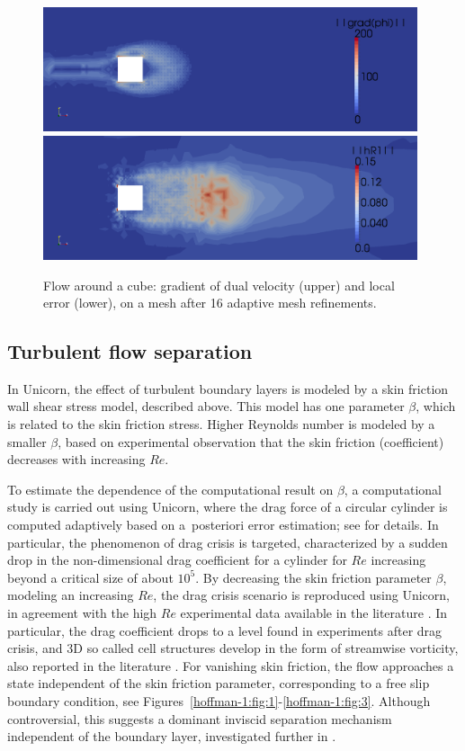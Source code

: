 \begin{figure}
  \centering
  \includegraphics[width=11cm]{chapters/hoffman-1/png/fig3a.png}
  \medskip
  \includegraphics[width=11cm]{chapters/hoffman-1/png/fig3b.png}
  \caption{Flow around a cube: gradient of dual velocity (upper) and local
    error (lower), on a mesh after 16 adaptive mesh refinements.}
  \label{hoffman-1:fig:cube3}
\end{figure}

\subsection{Turbulent flow separation}

In Unicorn, the effect of turbulent boundary layers is modeled by a
skin friction wall shear stress model, described above. This model has
one parameter $\beta$, which is related to the skin friction stress.
Higher Reynolds number is modeled by a smaller $\beta$, based on
experimental observation that the skin friction (coefficient)
decreases with increasing $Re$.

To estimate the dependence of the computational result on $\beta$, a
computational study is carried out using Unicorn, where the drag force
of a circular cylinder is computed adaptively based on a~posteriori
error estimation; see \citet{HoffmanJansson2009} for details. In
particular, the phenomenon of drag crisis is targeted, characterized
by a sudden drop in the non-dimensional drag coefficient for a
cylinder for $Re$ increasing beyond a critical size of about
$10^5$. By decreasing the skin friction parameter $\beta$, modeling an
increasing $Re$, the drag crisis scenario is reproduced using Unicorn,
in agreement with the high $Re$ experimental data available in the
literature \citep{Zdravkovich2003}. In particular, the drag
coefficient drops to a level found in experiments after drag crisis,
and 3D so called cell structures develop in the form of streamwise
vorticity, also reported in the literature \citep{Zdravkovich2003}.
For vanishing skin friction, the flow approaches a state independent
of the skin friction parameter, corresponding to a free slip boundary
condition, see Figures~\ref{hoffman-1:fig:1}-\ref{hoffman-1:fig:3}. Although
controversial, this suggests a dominant inviscid separation mechanism
independent of the boundary layer, investigated further in
\citet{HoffmanJohnson2008b,HoffmanJansson2009}.

